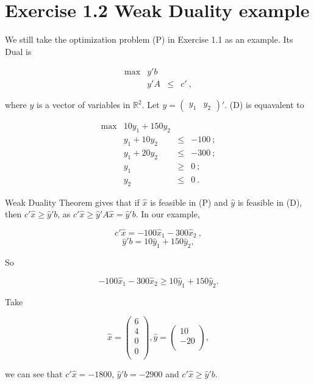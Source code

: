 \section{Exercise 1.2 Weak Duality example}

We still take the optimization problem (P) in Exercise 1.1 as an example. Its Dual is

\[
\begin{array}{rrcl}
 \max & y'b  &      &   \\
      &  y'A  &   \leq  & c'~,
\end{array}
\tag{D}
\]

where $y$ is a vector of variables in $ \mathbb{R}^2$. Let 
$y = 
\left(
\begin{array}{cc}
 y_1 & y_2 
\end{array}
\right)'$. (D) is equavalent to 

\[
\begin{array}{rrcl}
 \max & 10y_1+150y_2  &      &   \\
      &  y_1+10y_2  &   \leq  & -100~; \\
      & y_1 + 20y_2 & \leq & -300~; \\
      & y_1 & \geq & 0~;\\
      & y_2 & \leq & 0~.
\end{array}
\]

Weak Duality Theorem gives that if $\hat{x}$ is feasible in (P) and $\hat{y}$ is feasible in (D), then $c'\hat{x} \geq \hat{y}'b$, as $c'\hat{x} \geq \hat{y}'A\hat{x} = \hat{y}'b$. In our example,

$$c'\hat{x} = -100\hat{x}_1 - 300 \hat{x}_2~,$$
$$\hat{y}'b = 10\hat{y}_1 + 150\hat{y}_2,$$

So

$$-100\hat{x}_1 - 300 \hat{x}_2 \geq 10\hat{y}_1 + 150\hat{y}_2.$$

Take \

$$\hat{x} = 
\left(
\begin{array}{c}
 6 \\
 4 \\
 0 \\
 0 \\
\end{array}
\right),
\hat{y} =
\left(
\begin{array}{c}
 10 \\
 -20 \\
\end{array}
\right),
$$

we can see that $c'\hat{x} = -1800$, $\hat{y}'b = -2900$ and $c'\hat{x} \geq \hat{y}'b$.